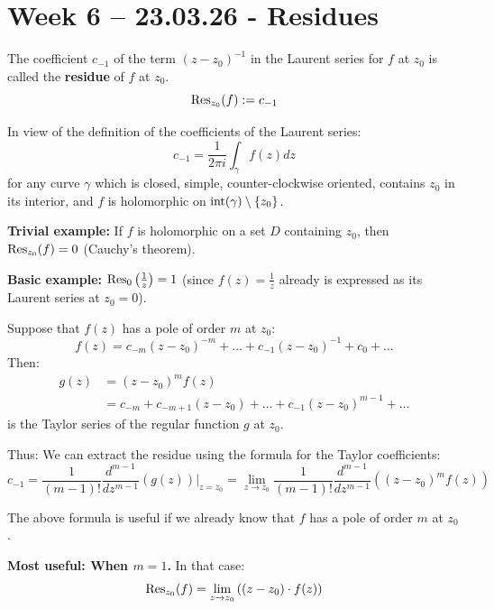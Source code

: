 \section{Week 6 -- 23.03.26 - Residues}

\begin{definition}
The coefficient $c_{-1}$ of the term $(z - z_0)^{-1}$ in the Laurent series for $f$ at $z_0$ is called the \textbf{residue} of $f$ at $z_0$.
\[ \operatorname{Res}_{z_0}(f) := c_{-1} \]

In view of the definition of the coefficients of the Laurent series:
\[ c_{-1} = \frac{1}{2\pi i} \int_\gamma f(z) dz \]
for any curve $\gamma$ which is closed, simple, counter-clockwise oriented, contains $z_0$ in its interior, and $f$ is holomorphic on $\operatorname{int}(\gamma) \setminus \{z_0\}$.
\end{definition}

\begin{example}
\textbf{Trivial example:} If $f$ is holomorphic on a set $D$ containing $z_0$, then $\operatorname{Res}_{z_0}(f) = 0$ (Cauchy's theorem).

\textbf{Basic example:} $\operatorname{Res}_0\left(\frac{1}{z}\right) = 1$ (since $f(z) = \frac{1}{z}$ already is expressed as its Laurent series at $z_0 = 0$).
\end{example}

\begin{remark}
Suppose that $f(z)$ has a pole of order $m$ at $z_0$:
\[ f(z) = c_{-m}(z - z_0)^{-m} + \dots + c_{-1}(z - z_0)^{-1} + c_0 + \dots \]
Then: 
\begin{align*}
g(z) &= (z - z_0)^m f(z) \\
&= c_{-m} + c_{-m+1}(z - z_0) + \dots + c_{-1}(z - z_0)^{m-1} + \dots
\end{align*}
is the Taylor series of the regular function $g$ at $z_0$.

Thus: We can extract the residue using the formula for the Taylor coefficients:
\[ c_{-1} = \frac{1}{(m-1)!} \frac{d^{m-1}}{dz^{m-1}} (g(z))\bigg|_{z=z_0} = \lim_{z \to z_0} \frac{1}{(m-1)!} \frac{d^{m-1}}{dz^{m-1}} \left((z - z_0)^m f(z)\right) \]

The above formula is useful if we already know that $f$ has a pole of order $m$ at $z_0$.

\vspace{0.3cm}
\textbf{Most useful: When $m = 1$.} In that case:
\[ \operatorname{Res}_{z_0}(f) = \lim_{z \to z_0} \left((z - z_0) \cdot f(z)\right) \]
\end{remark}

